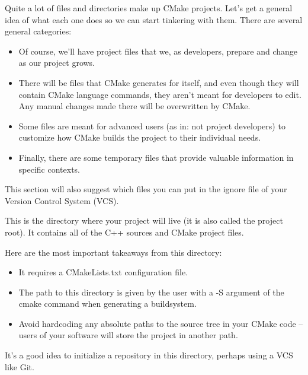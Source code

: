Quite a lot of files and directories make up CMake projects. Let’s get a general idea of what each one does so we can start tinkering with them. There are several general categories:

\begin{itemize}
\item
Of course, we’ll have project files that we, as developers, prepare and change as our project grows.

\item
There will be files that CMake generates for itself, and even though they will contain CMake language commands, they aren’t meant for developers to edit. Any manual changes made there will be overwritten by CMake.

\item
Some files are meant for advanced users (as in: not project developers) to customize how CMake builds the project to their individual needs.

\item
Finally, there are some temporary files that provide valuable information in specific contexts.
\end{itemize}

This section will also suggest which files you can put in the ignore file of your Version Control System (VCS).



This is the directory where your project will live (it is also called the project root). It contains all of the C++ sources and CMake project files.

Here are the most important takeaways from this directory:

\begin{itemize}
\item
It requires a CMakeLists.txt configuration file.

\item
The path to this directory is given by the user with a -S argument of the cmake command when generating a buildsystem.

\item
Avoid hardcoding any absolute paths to the source tree in your CMake code – users of your software will store the project in another path.
\end{itemize}

It’s a good idea to initialize a repository in this directory, perhaps using a VCS like Git.


